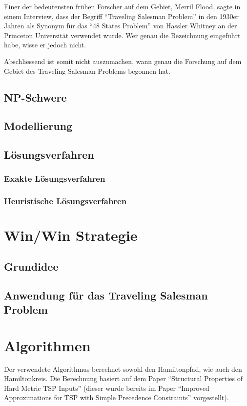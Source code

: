 \documentclass[a4paper]{article}
\begin{document}
\medskip

Einer der bedeutensten frühen Forscher auf dem Gebiet, Merril Flood, sagte in einem Interview, dass der Begriff "`Traveling Salesman Problem"' in den 1930er Jahren als Synonym für das "`48 States Problem"' von Hassler Whitney an der Princeton Universität verwendet wurde. Wer genau die Bezeichnung eingeführt habe, wisse er jedoch nicht.\cite{interview_merrill_flood84}

Abschliessend ist somit nicht auszumachen, wann genau die Forschung auf dem Gebiet des Traveling Salesman Problems begonnen hat.

\subsection{NP-Schwere}
\subsection{Modellierung}
\subsection{Lösungsverfahren}
\subsubsection{Exakte Lösungsverfahren}
\subsubsection{Heuristische Lösungsverfahren}
\newpage
\section{Win/Win Strategie}
\subsection{Grundidee}
\subsection{Anwendung für das Traveling Salesman Problem}
\newpage
\section{Algorithmen}
Der verwendete Algorithmus berechnet sowohl den Hamiltonpfad, wie auch den Hamiltonkreis. Die Berechnung basiert auf dem Paper "`Structural Properties of Hard Metric TSP Inputs"'\cite{moemke11} (dieser wurde bereits im Paper "`Improved Approximations for TSP with Simple Precedence Constraints"'\cite{boeckenhauer10} vorgestellt).
\end{document}
